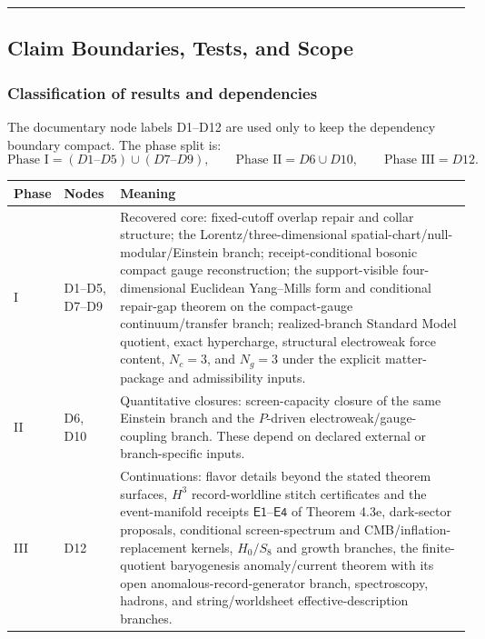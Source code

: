 \begin{center}\rule{0.5\linewidth}{0.5pt}\end{center}
\subsection{Claim Boundaries, Tests, and Scope}\label{8-claim-tests-and-scope-boundaries}

\subsubsection{Classification of results and dependencies}\label{81-classification-of-results}\label{16-summary-complete-axiom-set}

The documentary node labels D1--D12 are used only to keep the dependency boundary compact. The
phase split is:
\[
\text{Phase I}=(D1\text{--}D5)\cup(D7\text{--}D9),\qquad
\text{Phase II}=D6\cup D10,\qquad
\text{Phase III}=D12.
\]

\begin{center}
\scriptsize
\setlength{\tabcolsep}{3pt}
\begin{tabular}{@{}>{\raggedright\arraybackslash}p{}>{\raggedright\arraybackslash}p{}>{\raggedright\arraybackslash}p{}@{}}
\toprule
Phase & Nodes & Meaning \\
\midrule
I & D1--D5, D7--D9 & Recovered core: fixed-cutoff overlap repair and collar structure; the Lorentz/three-dimensional spatial-chart/null-modular/Einstein branch; receipt-conditional bosonic compact gauge reconstruction; the support-visible four-dimensional Euclidean Yang--Mills form and conditional repair-gap theorem on the compact-gauge continuum/transfer branch; realized-branch Standard Model quotient, exact hypercharge, structural electroweak force content, \(N_c=3\), and \(N_g=3\) under the explicit matter-package and admissibility inputs. \\
II & D6, D10 & Quantitative closures: screen-capacity closure of the same Einstein branch and the \(P\)-driven electroweak/gauge-coupling branch. These depend on declared external or branch-specific inputs. \\
III & D12 & Continuations: flavor details beyond the stated theorem surfaces, \(H^3\) record-worldline stitch certificates and the event-manifold receipts \(\mathsf{E1}\)--\(\mathsf{E4}\) of Theorem 4.3e, dark-sector proposals, conditional screen-spectrum and CMB/inflation-replacement kernels, \(H_0/S_8\) and growth branches, the finite-quotient baryogenesis anomaly/current theorem with its open anomalous-record-generator branch, spectroscopy, hadrons, and string/worldsheet effective-description branches. \\
\bottomrule
\end{tabular}
\end{center}

